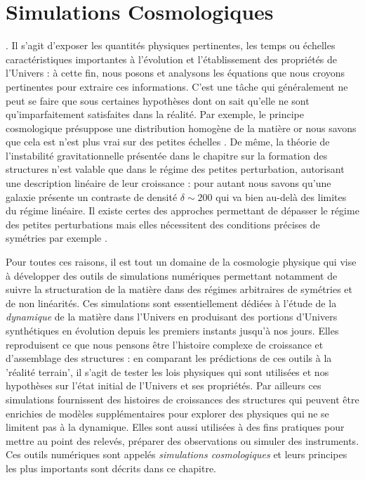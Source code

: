 \chapter{Simulations Cosmologiques}

. Il s'agit d'exposer les quantités physiques pertinentes, les temps ou échelles caractéristiques importantes à l'évolution et l'établissement des propriétés de l'Univers : à cette fin, nous posons et analysons les équations que nous croyons pertinentes pour extraire ces informations. C'est une tâche qui généralement ne peut se faire que sous certaines hypothèses dont on sait qu'elle ne sont qu'imparfaitement satisfaites dans la réalité. Par exemple, le principe cosmologique présuppose une distribution homogène de la matière or nous savons que cela est n'est plus vrai sur des petites échelles .  De même, la théorie de l'instabilité gravitationnelle présentée dans le chapitre sur la formation des structures n'est valable que dans le régime des petites perturbation, autorisant une description linéaire de leur croissance : pour autant nous savons qu'une galaxie présente un contraste de densité $\delta \sim 200$ qui va bien au-delà des limites du régime linéaire. Il existe certes des approches permettant de dépasser le régime des petites perturbations mais elles nécessitent des conditions précises de symétries par exemple .


Pour toutes ces raisons, il est tout un domaine de la cosmologie physique qui vise à développer des outils de simulations numériques permettant notamment de suivre la structuration de la matière dans des régimes arbitraires de symétries et de non linéarités. Ces simulations sont essentiellement dédiées à l'étude de la \textit{dynamique} de la matière dans l'Univers en produisant des portions d'Univers synthétiques en évolution depuis les premiers instants jusqu'à nos jours. Elles reproduisent ce que nous pensons être l'histoire complexe de croissance et d'assemblage des structures : en comparant les prédictions de ces outils à la 'réalité terrain', il s'agit de tester les lois physiques qui sont utilisées et nos hypothèses sur l'état initial de l'Univers et ses propriétés. Par ailleurs ces simulations fournissent des histoires de croissances des structures qui peuvent être enrichies de modèles supplémentaires pour explorer des physiques qui ne se limitent pas à la dynamique. Elles sont aussi utilisées à des fins pratiques pour mettre au point des relevés, préparer des observations ou simuler des instruments. Ces outils numériques sont appelés \textit{simulations cosmologiques} et leurs principes les plus importants sont décrits dans ce chapitre.

